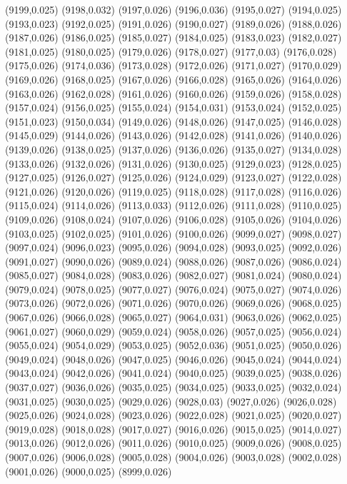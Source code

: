 (9199,0.025)
(9198,0.032)
(9197,0.026)
(9196,0.036)
(9195,0.027)
(9194,0.025)
(9193,0.023)
(9192,0.025)
(9191,0.026)
(9190,0.027)
(9189,0.026)
(9188,0.026)
(9187,0.026)
(9186,0.025)
(9185,0.027)
(9184,0.025)
(9183,0.023)
(9182,0.027)
(9181,0.025)
(9180,0.025)
(9179,0.026)
(9178,0.027)
(9177,0.03)
(9176,0.028)
(9175,0.026)
(9174,0.036)
(9173,0.028)
(9172,0.026)
(9171,0.027)
(9170,0.029)
(9169,0.026)
(9168,0.025)
(9167,0.026)
(9166,0.028)
(9165,0.026)
(9164,0.026)
(9163,0.026)
(9162,0.028)
(9161,0.026)
(9160,0.026)
(9159,0.026)
(9158,0.028)
(9157,0.024)
(9156,0.025)
(9155,0.024)
(9154,0.031)
(9153,0.024)
(9152,0.025)
(9151,0.023)
(9150,0.034)
(9149,0.026)
(9148,0.026)
(9147,0.025)
(9146,0.028)
(9145,0.029)
(9144,0.026)
(9143,0.026)
(9142,0.028)
(9141,0.026)
(9140,0.026)
(9139,0.026)
(9138,0.025)
(9137,0.026)
(9136,0.026)
(9135,0.027)
(9134,0.028)
(9133,0.026)
(9132,0.026)
(9131,0.026)
(9130,0.025)
(9129,0.023)
(9128,0.025)
(9127,0.025)
(9126,0.027)
(9125,0.026)
(9124,0.029)
(9123,0.027)
(9122,0.028)
(9121,0.026)
(9120,0.026)
(9119,0.025)
(9118,0.028)
(9117,0.028)
(9116,0.026)
(9115,0.024)
(9114,0.026)
(9113,0.033)
(9112,0.026)
(9111,0.028)
(9110,0.025)
(9109,0.026)
(9108,0.024)
(9107,0.026)
(9106,0.028)
(9105,0.026)
(9104,0.026)
(9103,0.025)
(9102,0.025)
(9101,0.026)
(9100,0.026)
(9099,0.027)
(9098,0.027)
(9097,0.024)
(9096,0.023)
(9095,0.026)
(9094,0.028)
(9093,0.025)
(9092,0.026)
(9091,0.027)
(9090,0.026)
(9089,0.024)
(9088,0.026)
(9087,0.026)
(9086,0.024)
(9085,0.027)
(9084,0.028)
(9083,0.026)
(9082,0.027)
(9081,0.024)
(9080,0.024)
(9079,0.024)
(9078,0.025)
(9077,0.027)
(9076,0.024)
(9075,0.027)
(9074,0.026)
(9073,0.026)
(9072,0.026)
(9071,0.026)
(9070,0.026)
(9069,0.026)
(9068,0.025)
(9067,0.026)
(9066,0.028)
(9065,0.027)
(9064,0.031)
(9063,0.026)
(9062,0.025)
(9061,0.027)
(9060,0.029)
(9059,0.024)
(9058,0.026)
(9057,0.025)
(9056,0.024)
(9055,0.024)
(9054,0.029)
(9053,0.025)
(9052,0.036)
(9051,0.025)
(9050,0.026)
(9049,0.024)
(9048,0.026)
(9047,0.025)
(9046,0.026)
(9045,0.024)
(9044,0.024)
(9043,0.024)
(9042,0.026)
(9041,0.024)
(9040,0.025)
(9039,0.025)
(9038,0.026)
(9037,0.027)
(9036,0.026)
(9035,0.025)
(9034,0.025)
(9033,0.025)
(9032,0.024)
(9031,0.025)
(9030,0.025)
(9029,0.026)
(9028,0.03)
(9027,0.026)
(9026,0.028)
(9025,0.026)
(9024,0.028)
(9023,0.026)
(9022,0.028)
(9021,0.025)
(9020,0.027)
(9019,0.028)
(9018,0.028)
(9017,0.027)
(9016,0.026)
(9015,0.025)
(9014,0.027)
(9013,0.026)
(9012,0.026)
(9011,0.026)
(9010,0.025)
(9009,0.026)
(9008,0.025)
(9007,0.026)
(9006,0.028)
(9005,0.028)
(9004,0.026)
(9003,0.028)
(9002,0.028)
(9001,0.026)
(9000,0.025)
(8999,0.026)
